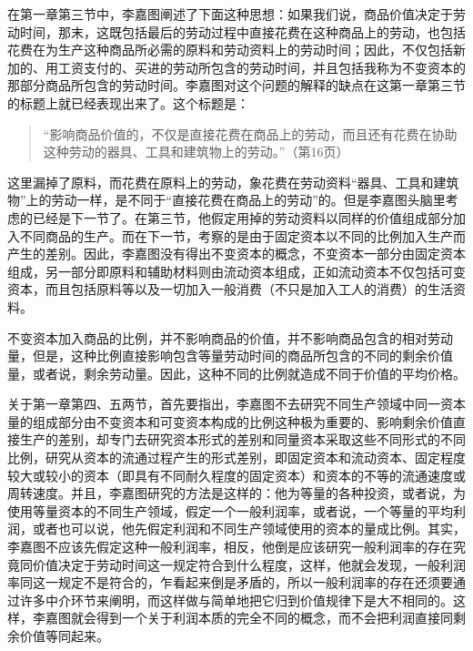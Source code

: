在第一章第三节中，李嘉图阐述了下面这种思想：如果我们说，商品价值决定于劳动时间，那末，这既包括最后的劳动过程中直接花费在这种商品上的劳动，也包括花费在为生产这种商品所必需的原料和劳动资料上的劳动时间；因此，不仅包括新加的、用工资支付的、买进的劳动所包含的劳动时间，并且包括我称为不变资本的那部分商品所包含的劳动时间。李嘉图对这个问题的解释的缺点在这第一章第三节的标题上就已经表现出来了。这个标题是：

\begin{quote}{“影响商品价值的，不仅是直接花费在商品上的劳动，而且还有花费在协助这种劳动的器具、工具和建筑物上的劳动。”（第16页）}\end{quote}

这里漏掉了原料，而花费在原料上的劳动，象花费在劳动资料“器具、工具和建筑物”上的劳动一样，是不同于“直接花费在商品上的劳动”的。但是李嘉图头脑里考虑的已经是下一节了。在第三节，他假定用掉的劳动资料以同样的价值组成部分加入不同商品的生产。而在下一节，考察的是由于固定资本以不同的比例加入生产而产生的差别。因此，李嘉图没有得出不变资本的概念，不变资本一部分由固定资本组成，另一部分即原料和辅助材料则由流动资本组成，正如流动资本不仅包括可变资本，而且包括原料等以及一切加入一般消费（不只是加入工人的消费）的生活资料。

不变资本加入商品的比例，并不影响商品的价值，并不影响商品包含的相对劳动量，但是，这种比例直接影响包含等量劳动时间的商品所包含的不同的剩余价值量，或者说，剩余劳动量。因此，这种不同的比例就造成不同于价值的平均价格。

关于第一章第四、五两节，首先要指出，李嘉图不去研究不同生产领域中同一资本量的组成部分由不变资本和可变资本构成的比例这种极为重要的、影响剩余价值直接生产的差别，却专门去研究资本形式的差别和同量资本采取这些不同形式的不同比例，研究从资本的流通过程产生的形式差别，即固定资本和流动资本、固定程度较大或较小的资本（即具有不同耐久程度的固定资本）和资本的不等的流通速度或周转速度。并且，李嘉图研究的方法是这样的：他为等量的各种投资，或者说，为使用等量资本的不同生产领域，假定一个一般利润率，或者说，一个等量的平均利润，或者也可以说，他先假定利润和不同生产领域使用的资本的量成比例。其实，李嘉图不应该先假定这种一般利润率，相反，他倒是应该研究一般利润率的存在究竟同价值决定于劳动时间这一规定符合到什么程度，这样，他就会发现，一般利润率同这一规定不是符合的，乍看起来倒是矛盾的，所以一般利润率的存在还须要通过许多中介环节来阐明，而这样做与简单地把它归到价值规律下是大不相同的。这样，李嘉图就会得到一个关于利润本质的完全不同的概念，而不会把利润直接同剩余价值等同起来。

